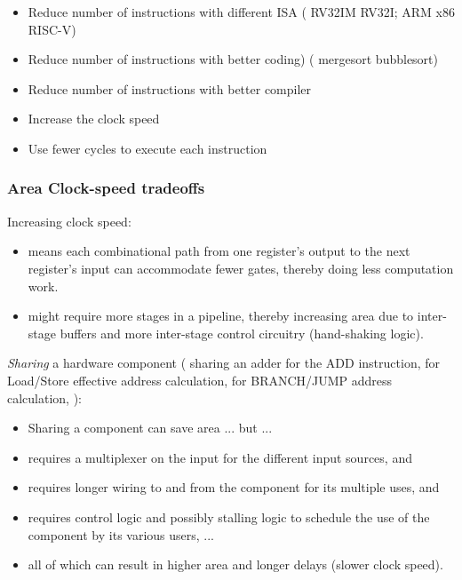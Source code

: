 \begin{frame}[fragile]
\begin{itemize}
  \item Reduce number of instructions with different ISA ({\eg} RV32IM
      {\vs} RV32I; ARM {\vs} x86 {\vs} RISC-V)

  \item Reduce number of instructions with better coding) ({\eg} mergesort {\vs} bubblesort)

  \item Reduce number of instructions with better compiler

  \item Increase the clock speed

  \item Use fewer cycles to execute each instruction
\end{itemize}

\end{frame}


\begin{frame}[fragile]
\frametitle{Area {\vs} Clock-speed tradeoffs}

\footnotesize

Increasing clock speed:
\begin{itemize}

  \item means each combinational path from one register's output to
      the next register's input can accommodate fewer gates, thereby
      doing less computation work.

  \item might require more stages in a pipeline, thereby increasing
      area due to inter-stage buffers and more inter-stage control
      circuitry (hand-shaking logic).

\end{itemize}

\PAUSE{\vxx}

\emph{Sharing} a hardware component ({\eg} sharing an adder for the
ADD instruction, for Load/Store effective address calculation, for
BRANCH/JUMP address calculation, {\etc}):

\begin{itemize}
    \item Sharing a component can save area ... but ...

    \item requires a multiplexer on the input for the different input sources, and

    \item requires longer wiring to and from the component for its multiple uses, and

    \item requires control logic and possibly stalling logic to
        schedule the use of the component by its various users, ...

   \item all of which can result in higher area and longer delays (slower clock speed).
\end{itemize}

\end{frame}

